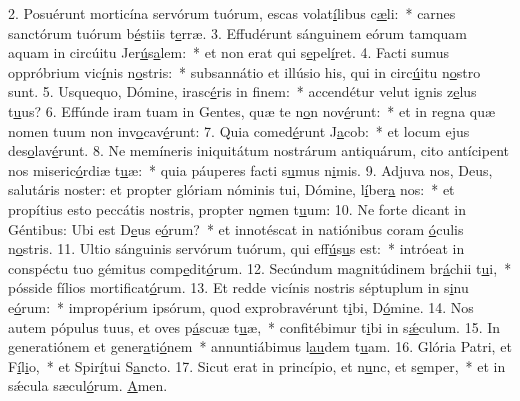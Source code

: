 2. Posuérunt morticína servórum tuórum, escas volat\uline{í}libus c\uline{æ}li:~* carnes sanctórum tuórum b\uline{é}stiis t\uline{e}rræ.
3. Effudérunt sánguinem eórum tamquam aquam in circúitu Jer\uline{ú}s\uline{a}lem:~* et non erat qui s\uline{e}pel\uline{í}ret.
4. Facti sumus oppróbrium vic\uline{í}nis n\uline{o}stris:~* subsannátio et illúsio his, qui in circ\uline{ú}itu n\uline{o}stro sunt.
5. Usquequo, Dómine, irasc\uline{é}ris in f\uline{i}nem:~* accendétur velut ignis z\uline{e}lus t\uline{u}us?
6. Effúnde iram tuam in Gentes, quæ te n\uline{o}n nov\uline{é}runt:~* et in regna quæ nomen tuum non inv\uline{o}cav\uline{é}runt:
7. Quia comed\uline{é}runt J\uline{a}cob:~* et locum ejus des\uline{o}lav\uline{é}runt.
8. Ne memíneris iniquitátum nostrárum antiquárum, cito antícipent nos miseric\uline{ó}rdiæ t\uline{u}æ:~* quia páuperes facti s\uline{u}mus n\uline{i}mis.
9. Adjuva nos, Deus, salutáris noster: et propter glóriam nóminis tui, Dómine, l\uline{í}ber\uline{a} nos:~* et propítius esto peccátis nostris, propter n\uline{o}men t\uline{u}um:
10. Ne forte dicant in Géntibus: Ubi est D\uline{e}us e\uline{ó}rum?~* et innotéscat in natiónibus coram \uline{ó}culis n\uline{o}stris.
11. Ultio sánguinis servórum tuórum, qui eff\uline{ú}s\uline{u}s est:~* intróeat in conspéctu tuo gémitus comp\uline{e}dit\uline{ó}rum.
12. Secúndum magnitúdinem br\uline{á}chii t\uline{u}i,~* pósside fílios mortif\uline{i}cat\uline{ó}rum.
13. Et redde vicínis nostris séptuplum in s\uline{i}nu e\uline{ó}rum:~* impropérium ipsórum, quod exprobravérunt t\uline{i}bi, D\uline{ó}mine.
14. Nos autem pópulus tuus, et oves p\uline{á}scuæ t\uline{u}æ,~* confitébimur t\uline{i}bi in s\uline{ǽ}culum.
15. In generatiónem et gener\uline{a}ti\uline{ó}nem~* annuntiábimus l\uline{au}dem t\uline{u}am.
16. Glória Patri, et F\uline{í}l\uline{i}o,~* et Spir\uline{í}tui S\uline{a}ncto.
17. Sicut erat in princípio, et n\uline{u}nc, et s\uline{e}mper,~* et in sǽcula sæcul\uline{ó}rum. \uline{A}men.
